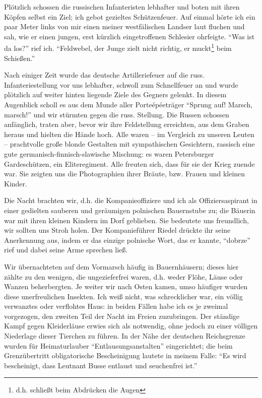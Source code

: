 \documentclass[a5paper,pagesize,10pt,twoside=true]{scrbook}
\begin{document}
Plötzlich schossen die russischen Infanteristen lebhafter und boten mit ihren Köpfen selbst ein Ziel; ich gebot gezieltes Schützenfeuer. Auf einmal hörte ich ein paar Meter links von mir einen meiner westfälischen Landser laut fluchen und sah, wie er einen jungen, erst kürzlich eingetroffenen Schlesier ohrfeigte. \enquote{Was ist da los?} rief ich. \enquote{Feldwebel, der Junge zielt nicht richtig, er muckt\footnote{d.h. schließt beim Abdrücken die Augen} beim Schießen.}

Nach einiger Zeit wurde das deutsche Artilleriefeuer auf die russ. Infanteriestellung vor uns lebhafter, schwoll zum Schnellfeuer an und wurde plötzlich auf weiter hinten liegende Ziele des Gegners gelenkt. In diesem Augenblick scholl es aus dem Munde aller Porteépéeträger \enquote{Sprung auf! Marsch, marsch!} und wir stürmten gegen die russ. Stellung. Die Russen schossen anfänglich, traten aber, bevor wir ihre Feldstellung erreichten, aus dem Graben heraus und hielten die Hände hoch. Alle waren -- im Vergleich zu unseren Leuten -- prachtvolle große blonde Gestalten mit sympathischen Gesichtern, rassisch eine gute germanisch-finnisch-slawische Mischung: es waren Petersburger Gardeschützen, ein Eliteregiment. Alle freuten sich, dass für sie der Krieg zuende war. Sie zeigten uns die Photographien ihrer Bräute, bzw. Frauen und kleinen Kinder.

Die Nacht brachten wir, d.h. die Kompanieoffiziere und ich als Offiziersaspirant in einer gedielten sauberen und geräumigen polnischen Bauernstube zu; die Bäuerin war mit ihren kleinen Kindern im Dorf geblieben. Sie bedeutete uns freundlich, wir sollten uns Stroh holen. Der Kompanieführer Riedel drückte ihr seine Anerkennung aus, indem er das einzige polnische Wort, das er kannte, \enquote{dobrze} rief und dabei seine Arme sprechen ließ.

Wir übernachteten auf dem Vormarsch häufig in Bauernhäusern; dieses hier zählte zu den wenigen, die ungezieferfrei waren, d.h. weder Flöhe, Läuse oder Wanzen beherbergten. Je weiter wir nach Osten kamen, umso häufiger wurden diese unerfreulichen Insekten. Ich weiß nicht, was schrecklicher war, ein völlig verwanztes oder verflohtes Haus: in beiden Fällen habe ich es je zweimal vorgezogen, den zweiten Teil der Nacht im Freien zuzubringen. Der ständige Kampf gegen Kleiderläuse erwies sich als notwendig, ohne jedoch zu einer völligen Niederlage dieser Tierchen zu führen. In der Nähe der deutschen Reichsgrenze wurden für Heimaturlauber \enquote{Entlausungsanstalten} eingerichtet; die beim Grenzübertritt obligatorische Bescheinigung lautete in meinem Falle: \enquote{Es wird bescheinigt, dass Leutnant Busse entlaust und seuchenfrei ist.}
\end{document}
